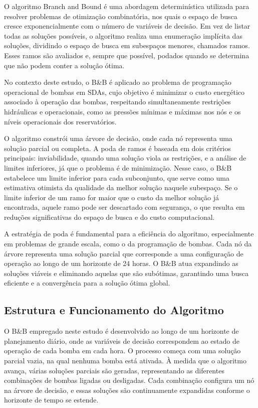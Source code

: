 \documentclass[12pt,a4paper,oneside,linenumbers=off,latinmodern=off,timesnews=off,english,spanish]{rctart-class/rctart}
\begin{document}
O algoritmo Branch and Bound é uma abordagem determinística utilizada para resolver problemas de otimização combinatória, nos quais o espaço de busca cresce exponencialmente com o número de variáveis de decisão. Em vez de listar todas as soluções possíveis, o algoritmo realiza uma enumeração implícita das soluções, dividindo o espaço de busca em subespaços menores, chamados ramos. Esses ramos são avaliados e, sempre que possível, podados quando se determina que não podem conter a solução ótima.

No contexto deste estudo, o B\&B é aplicado ao problema de programação operacional de bombas em SDAs, cujo objetivo é minimizar o custo energético associado à operação das bombas, respeitando simultaneamente restrições hidráulicas e operacionais, como as pressões mínimas e máximas nos nós e os níveis operacionais dos reservatórios.

O algoritmo constrói uma árvore de decisão, onde cada nó representa uma solução parcial ou completa. A poda de ramos é baseada em dois critérios principais: inviabilidade, quando uma solução viola as restrições, e a análise de limites inferiores, já que o problema é de minimização. Nesse caso, o B\&B estabelece um limite inferior para cada subconjunto, que serve como uma estimativa otimista da qualidade da melhor solução naquele subespaço. Se o limite inferior de um ramo for maior que o custo da melhor solução já encontrada, aquele ramo pode ser descartado com segurança, o que resulta em reduções significativas do espaço de busca e do custo computacional.

A estratégia de poda é fundamental para a eficiência do algoritmo, especialmente em problemas de grande escala, como o da programação de bombas. Cada nó da árvore representa uma solução parcial que corresponde a uma configuração de operação ao longo de um horizonte de 24 horas. O B\&B atua expandindo as soluções viáveis e eliminando aquelas que são subótimas, garantindo uma busca eficiente e a convergência para a solução ótima global.


\subsection{Estrutura e Funcionamento do Algoritmo}

O B\&B empregado neste estudo é desenvolvido ao longo de um horizonte de planejamento diário, onde as variáveis de decisão correspondem ao estado de operação de cada bomba em cada hora. O processo começa com uma solução parcial vazia, na qual nenhuma bomba está ativada. À medida que o algoritmo avança, várias soluções parciais são geradas, representando as diferentes combinações de bombas ligadas ou desligadas. Cada combinação configura um nó na árvore de decisão, e essas soluções são continuamente expandidas conforme o horizonte de tempo se estende.
\end{document}
